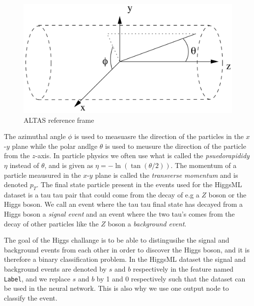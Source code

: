 \documentclass[../../main/main.tex]{subfiles}
\begin{document}
\begin{figure}[H]
  \centering
  \includegraphics[width = 0.8\linewidth]{../../figures/ATLAS-reference-frame.png}
  \caption{ALTAS reference frame}
  \label{fig:ATLAS}
\end{figure}

The azimuthal angle \(\phi\) is used to measuasre the direction of the particles in the \(x\)-\(y\) plane while the polar andlge \(\theta\) is used to meusure the direction of the particle from the \(z\)-axis. In particle physics we often use what is called the \emph{psuedorapididy} \(\eta\) instead of \(\theta\), and is given as \(\eta=-\ln(\tan(\theta/2))\). The momentum of a particle meausured in the \(x\)-\(y\) plane is called the \emph{transverse momentum} and is denoted \(p_T\). The final state particle present in the events used for the HiggsML dataset is a tau tau pair that could come from the decay of e.g a \(Z\) boson or the Higgs boson. We call an event where the tau tau final state has decayed from a Higgs boson a \emph{signal event} and an event where the two tau's comes from the decay of other particles like the \(Z\) boson a \emph{background event}.

The goal of the Higgs challange is to be able to distingusihe the signal and background events from each other in order to discover the Higgs boson, and it is therefore a binary classification problem. In the HiggsML dataset the signal and background events are denoted by \(s\) and \(b\) respectively in the feature named \texttt{Label}, and we replace \(s\) and \(b\) by 1 and 0 respectively such that the dataset can be used in the neural network. This is also why we use one output node to classify the event.
\end{document}
